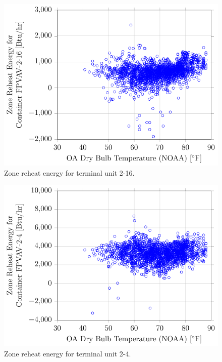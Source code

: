 \begin{figure}
\centering
\includegraphics[]{Plots/2016-10-19-1424-ZoneReheatEnergyforContainerFPVAV216vsOADryBulbTemperatureNOAA.pdf}
\caption{Zone reheat energy for terminal unit 2-16.}
\label{fig:2016-10-19-1424-ZoneReheatEnergyforContainerFPVAV216vsOADryBulbTemperatureNOAA}
\end{figure}

\begin{figure}
\centering
\includegraphics[]{Plots/2016-10-19-1438-ZoneReheatEnergyforContainerFPVAV24vsOADryBulbTemperatureNOAA.pdf}
\caption{Zone reheat energy for terminal unit 2-4.}
\label{fig:2016-10-19-1438-ZoneReheatEnergyforContainerFPVAV24vsOADryBulbTemperatureNOAA}
\end{figure}

